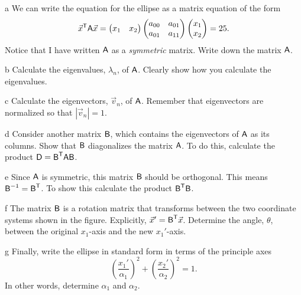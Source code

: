 \documentclass[]{homework}
\begin{document}
\begin{problem}{1}
  \begin{subproblem}{a}
    We can write the equation for the ellipse as a matrix equation of
    the form
    \[ {\vec x}^{\textsf T} \textsf A \vec x
    =
    \begin{pmatrix} x_1 & x_2 \end{pmatrix}
    \begin{pmatrix} a_{00} & a_{01} \\ a_{01} & a_{11} \end{pmatrix}
    \begin{pmatrix} x_1 \\ x_2 \end{pmatrix}
    = 25.
    \]
    Notice that I have written $\textsf A$ as a \emph{symmetric} matrix.
    Write down the matrix $\textsf A$.
  \end{subproblem}
  \begin{subproblem}{b}
    Calculate the eigenvalues, $\lambda_n$, of $\textsf A$.  Clearly show how
    you calculate the eigenvalues. 
  \end{subproblem}
  \begin{subproblem}{c}
    Calculate the eigenvectors, $\vec v_n$, of $\textsf A$.  Remember that
    eigenvectors are normalized so that $|\vec v_n|=1$. 
  \end{subproblem}
  \begin{subproblem}{d}
    Consider another matrix $\textsf B$, which contains the eigenvectors of $\textsf A$
    as its columns.
    Show that $\textsf B$ diagonalizes the matrix $\textsf A$.  To do this,
    calculate the product $\textsf D = {\textsf B}^{\textsf T}\textsf A\textsf B$.
  \end{subproblem}
  \begin{subproblem}{e}
    Since $\textsf A$ is symmetric, this matrix $\textsf B$ should be orthogonal.
    This means ${\textsf B}^{-1} = {\textsf B}^{\textsf T}$.  To show this
    calculate the product ${\textsf B}^{\textsf T}\textsf B$. 
  \end{subproblem}
  \begin{subproblem}{f}
    The matrix $\textsf B$ is a rotation matrix that transforms between the
    two coordinate systems shown in the figure.  Explicitly, $\vec x' =
    {\textsf B}^{\textsf T} \vec x$.  Determine the angle, $\theta$, between the
    original $x_1$-axis and the new $x_1'$-axis.
  \end{subproblem}
  \begin{subproblem}{g}
    Finally, write the ellipse in standard form in terms of the principle
    axes
    \[ \left( \frac{x_1'}{\alpha_1} \right)^2 + \left( \frac{x_2'}{\alpha_2}
    \right)^2 = 1 .\]
    In other words, determine $\alpha_1$ and $\alpha_2$.
  \end{subproblem}


\end{problem}
\end{document}
